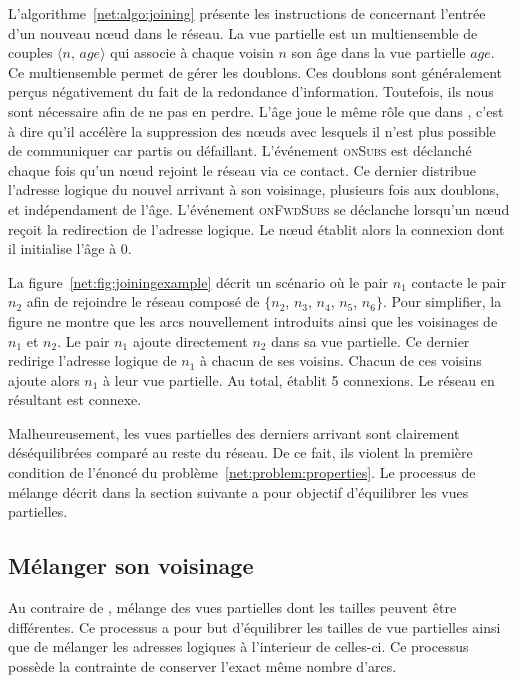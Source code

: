 L'algorithme~\ref{net:algo:joining} présente les instructions de \SPRAY
concernant l'entrée d'un nouveau nœud dans le réseau. La vue partielle est un
multiensemble de couples $\langle n,\, age\rangle$ qui associe à chaque voisin
$n$ son âge dans la vue partielle $age$. Ce multiensemble permet de gérer les
doublons. Ces doublons sont généralement perçus négativement du fait de la
redondance d'information. Toutefois, ils nous sont nécessaire afin de ne pas en
perdre. L'âge joue le même rôle que dans \CYCLON, c'est à dire qu'il accélère la
suppression des nœuds avec lesquels il n'est plus possible de communiquer car
partis ou défaillant. L'événement \textsc{onSubs} est déclanché chaque fois qu'un
nœud rejoint le réseau via ce contact. Ce dernier distribue l'adresse logique du
nouvel arrivant à son voisinage, plusieurs fois aux doublons, et indépendament
de l'âge. L'événement \textsc{onFwdSubs} se déclanche lorsqu'un nœud reçoit la
redirection de l'adresse logique. Le nœud établit alors la connexion dont il
initialise l'âge à $0$.

La figure~\ref{net:fig:joiningexample} décrit un scénario où le pair $n_1$
contacte le pair $n_2$ afin de rejoindre le réseau composé de $\{n_2$, $n_3$,
$n_4$, $n_5$, $n_6\}$. Pour simplifier, la figure ne montre que les arcs
nouvellement introduits ainsi que les voisinages de $n_1$ et $n_2$. Le pair
$n_1$ ajoute directement $n_2$ dans sa vue partielle. Ce dernier redirige
l'adresse logique de $n_1$ à chacun de ses voisins.  Chacun de ces voisins
ajoute alors $n_1$ à leur vue partielle. Au total, \SPRAY établit 5
connexions. Le réseau en résultant est connexe.

Malheureusement, les vues partielles des derniers arrivant sont clairement
déséquilibrées comparé au reste du réseau. De ce fait, ils violent la première
condition de l'énoncé du problème~\ref{net:problem:properties}. Le processus de
mélange décrit dans la section suivante a pour objectif d'équilibrer les vues
partielles.

\subsection{Mélanger son voisinage}
\label{net:subsec:shuffling}

Au contraire de \CYCLON, \SPRAY mélange des vues partielles dont les tailles
peuvent être différentes. Ce processus a pour but d'équilibrer les tailles de
vue partielles ainsi que de mélanger les adresses logiques à l'interieur de
celles-ci.  Ce processus possède la contrainte de conserver l'exact même nombre
d'arcs.

